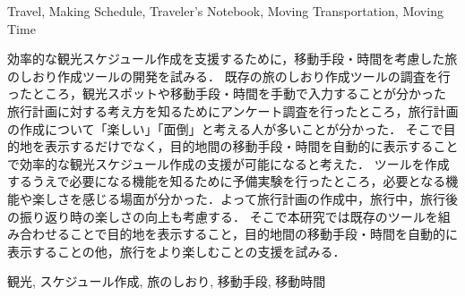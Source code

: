 \documentclass{funthesis}
\begin{document}
\begin{ekeyword}
Travel, Making Schedule, Traveler's Notebook, Moving Transportation, Moving Time
\end{ekeyword}

\begin{jabstract}
効率的な観光スケジュール作成を支援するために，移動手段・時間を考慮した旅のしおり作成ツールの開発を試みる．
既存の旅のしおり作成ツールの調査を行ったところ，観光スポットや移動手段・時間を手動で入力することが分かった
旅行計画に対する考え方を知るためにアンケート調査を行ったところ，旅行計画の作成について「楽しい」「面倒」と考える人が多いことが分かった．
そこで目的地を表示するだけでなく，目的地間の移動手段・時間を自動的に表示することで効率的な観光スケジュール作成の支援が可能になると考えた．
ツールを作成するうえで必要になる機能を知るために予備実験を行ったところ，必要となる機能や楽しさを感じる場面が分かった．よって旅行計画の作成中，旅行中，旅行後の振り返り時の楽しさの向上も考慮する．
そこで本研究では既存のツールを組み合わせることで目的地を表示すること，目的地間の移動手段・時間を自動的に表示することの他，旅行をより楽しむことの支援を試みる．




\end{jabstract}

\begin{jkeyword}
観光, スケジュール作成, 旅のしおり, 移動手段, 移動時間
\end{jkeyword}

\tableofcontents %
\end{document}
